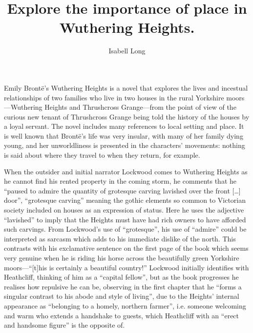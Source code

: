 \documentclass[a4paper,12pt]{article}
\begin{document}
\title{Explore the importance of place in Wuthering Heights.}
\author{Isabell Long}
\maketitle

Emily Bront\"{e}'s Wuthering Heights is a novel that explores the lives and incestual relationships of two families who live in two houses in the rural Yorkshire moors---Wuthering Heights and Thrushcross Grange---from the point of view of the curious new tenant of Thrushcross Grange being told the history of the houses by a loyal servant. The novel includes many references to local setting and place. It is well known that Bront\"{e}'s life was very insular, with many of her family dying young, and her unworldliness is presented in the characters' movements: nothing is said about where they travel to when they return, for example.

When the outsider and initial narrator Lockwood comes to Wuthering Heights as he cannot find his rented property in the coming storm, he comments that he ``paused to admire the quantity of grotesque carving lavished over the front [\ldots] door'', ``grotesque carving'' meaning the gothic elements so common to Victorian society included on houses as an expression of status. Here he uses the adjective ``lavished'' to imply that the Heights must have had rich owners to have afforded such carvings. From Lockwood's use of ``grotesque'', his use of ``admire'' could be interpreted as sarcasm which adds to his immediate dislike of the north. This contrasts with his exclamative sentence on the first page of the book which seems very genuine when he is riding his horse across the beautifully green Yorkshire moors---``[t]his is certainly a beautiful country!'' Lockwood initially identifies with Heathcliff, thinking of him as a ``capital fellow'', but as the book progresses he realises how repulsive he can be, observing in the first chapter that he ``forms a singular contrast to his abode and style of living'', due to the Heights' internal appearance as ``belonging to a homely, northern farmer'', i.e. someone welcoming and warm who extends a handshake to guests, which Heathcliff with an ``erect and handsome figure'' is the opposite of.
\end{document}
